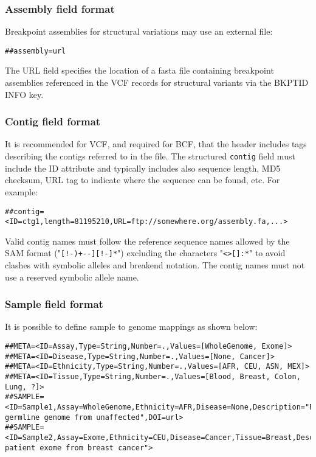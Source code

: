 \documentclass[8pt]{article}
\begin{document}
\subsubsection{Assembly field format}
Breakpoint assemblies for structural variations may use an external file:
\begin{verbatim}
##assembly=url
\end{verbatim}

The URL field specifies the location of a fasta file containing breakpoint assemblies referenced in the VCF records for structural variants via the BKPTID INFO key.

\subsubsection{Contig field format}
\label{sec-contig-field}
It is recommended for VCF, and required for BCF, that the header includes tags describing the contigs referred to in the file.
The structured \texttt{contig} field must include the ID attribute and typically includes also sequence length, MD5 checksum, URL tag to indicate where the sequence can be found, etc.
For example:
\begin{verbatim}
##contig=<ID=ctg1,length=81195210,URL=ftp://somewhere.org/assembly.fa,...>
\end{verbatim}

\noindent
Valid contig names must follow the reference sequence names allowed by the SAM format ("{\tt [!-)+--][!-]*}") excluding the characters "\texttt{\textless\textgreater[]:*}" to avoid clashes with symbolic alleles and breakend notation.
The contig names must not use a reserved symbolic allele name.


\subsubsection{Sample field format}
It is possible to define sample to genome mappings as shown below:
{\scriptsize
\begin{verbatim}
##META=<ID=Assay,Type=String,Number=.,Values=[WholeGenome, Exome]>
##META=<ID=Disease,Type=String,Number=.,Values=[None, Cancer]>
##META=<ID=Ethnicity,Type=String,Number=.,Values=[AFR, CEU, ASN, MEX]>
##META=<ID=Tissue,Type=String,Number=.,Values=[Blood, Breast, Colon, Lung, ?]>
##SAMPLE=<ID=Sample1,Assay=WholeGenome,Ethnicity=AFR,Disease=None,Description="Patient germline genome from unaffected",DOI=url>
##SAMPLE=<ID=Sample2,Assay=Exome,Ethnicity=CEU,Disease=Cancer,Tissue=Breast,Description="European patient exome from breast cancer">
\end{verbatim}}
\end{document}
